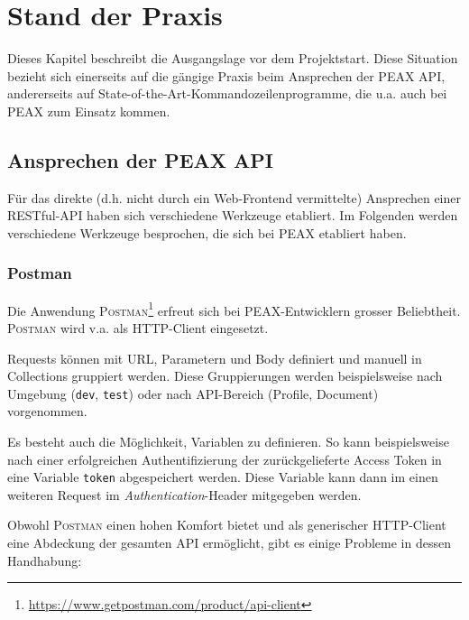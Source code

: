 \section{Stand der Praxis}

Dieses Kapitel beschreibt die Ausgangslage vor dem Projektstart. Diese Situation bezieht sich einerseits auf die gängige Praxis beim Ansprechen der PEAX API, andererseits auf State-of-the-Art-Kommandozeilenprogramme, die u.a. auch bei PEAX zum Einsatz kommen.

\subsection{Ansprechen der PEAX API}

Für das direkte (d.h. nicht durch ein Web-Frontend vermittelte) Ansprechen einer RESTful-API haben sich verschiedene Werkzeuge etabliert. Im Folgenden werden verschiedene Werkzeuge besprochen, die sich bei PEAX etabliert haben.

\subsubsection{Postman}

Die Anwendung \textsc{Postman}\footnote{\url{https://www.getpostman.com/product/api-client}} erfreut sich bei PEAX-Entwicklern grosser Beliebtheit. \textsc{Postman} wird v.a. als HTTP-Client eingesetzt.

Requests können mit URL, Parametern und Body definiert und manuell in Collections gruppiert werden. Diese Gruppierungen werden beispielsweise nach Umgebung (\texttt{dev}, \texttt{test}) oder nach API-Bereich (Profile, Document) vorgenommen.

Es besteht auch die Möglichkeit, Variablen zu definieren. So kann beispielsweise nach einer erfolgreichen Authentifizierung der zurückgelieferte Access Token in eine Variable \texttt{token} abgespeichert werden. Diese Variable kann dann im einen weiteren Request im \textit{Authentication}-Header mitgegeben werden.

Obwohl \textsc{Postman} einen hohen Komfort bietet und als generischer HTTP-Client eine Abdeckung der gesamten API ermöglicht, gibt es einige Probleme in dessen Handhabung:

